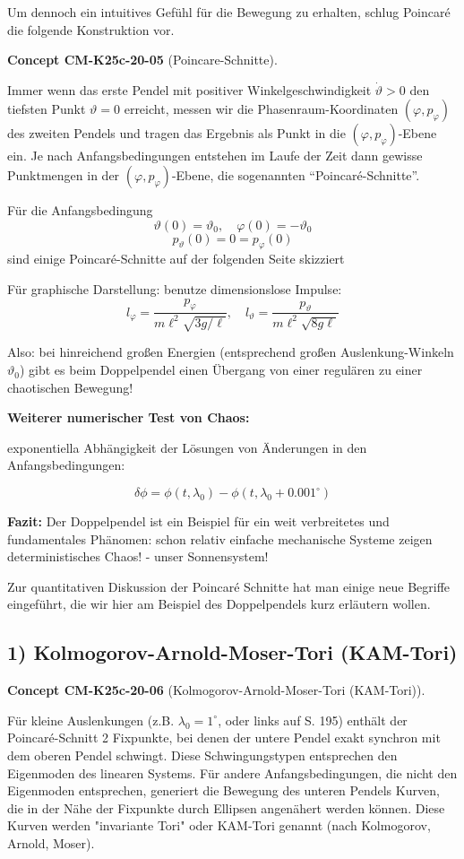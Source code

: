 \documentclass[10pt, letterpaper]{article}
\newcommand{\CustomHeading}[3]{%
  \par\medskip\noindent%
  \textbf{#1 #2} \textnormal{(#3)}.\enskip%
}
\newenvironment{CONC}[2]{\begin{unitbox}\CustomHeading{Concept}{#1}{#2}}{\end{unitbox}}
\begin{document}
Um dennoch ein intuitives Gefühl für die Bewegung zu erhalten, schlug Poincaré die folgende Konstruktion vor.

\begin{CONC}{CM-K25c-20-05}{Poincare-Schnitte}
Immer wenn das erste Pendel mit positiver Winkelgeschwindigkeit $\dot{\vartheta}>0$ den tiefsten Punkt $\vartheta=0$ erreicht, messen wir die Phasenraum-Koordinaten $(\varphi,p_\varphi)$ des zweiten Pendels und tragen das Ergebnis als Punkt in die $(\varphi,p_\varphi)$-Ebene ein. Je nach Anfangsbedingungen entstehen im Laufe der Zeit dann gewisse Punktmengen in der $(\varphi,p_\varphi)$-Ebene, die sogenannten ``Poincaré-Schnitte''.

Für die Anfangsbedingung
\[\vartheta(0)=\vartheta_0, \quad \varphi(0)=-\vartheta_0\]
\[p_\vartheta(0)=0=p_\varphi(0)\]
sind einige Poincaré-Schnitte auf der folgenden Seite skizziert


Für graphische Darstellung: benutze dimensionslose Impulse:
\[l_\varphi = \frac{p_\varphi}{m\ell^2\sqrt{3g/\ell}}, \quad l_\vartheta = \frac{p_\vartheta}{m\ell^2\sqrt{8g\ell}}\]



\noindent Also: bei hinreichend großen Energien (entsprechend großen Auslenkung-Winkeln $\vartheta_0$) gibt es beim Doppelpendel einen Übergang von einer regulären zu einer chaotischen Bewegung!
\end{CONC}


\textbf{Weiterer numerischer Test von Chaos:}

exponentiella Abhängigkeit der Lösungen von Änderungen in den Anfangsbedingungen:



\[ \delta\phi = \phi(t,\lambda_0) - \phi(t,\lambda_0+0.001^\circ) \]

\textbf{Fazit:} Der Doppelpendel ist ein Beispiel für ein weit verbreitetes und fundamentales Phänomen: schon relativ einfache mechanische Systeme zeigen deterministisches Chaos! - unser Sonnensystem!

Zur quantitativen Diskussion der Poincaré Schnitte hat man einige neue Begriffe eingeführt, die wir hier am Beispiel des Doppelpendels kurz erläutern wollen.

\subsection*{1) Kolmogorov-Arnold-Moser-Tori (KAM-Tori)}

\begin{CONC}{CM-K25c-20-06}{Kolmogorov-Arnold-Moser-Tori (KAM-Tori)}
Für kleine Auslenkungen (z.B. $\lambda_0=1^\circ$, oder links auf S. 195) enthält der Poincaré-Schnitt 2 Fixpunkte, bei denen der untere Pendel exakt synchron mit dem oberen Pendel schwingt. Diese Schwingungstypen entsprechen den Eigenmoden des linearen
Systems. Für andere Anfangsbedingungen, die nicht den Eigenmoden entsprechen, generiert die Bewegung des unteren Pendels Kurven, die in der Nähe der Fixpunkte durch Ellipsen angenähert werden können. Diese Kurven werden "invariante Tori" oder KAM-Tori genannt (nach Kolmogorov, Arnold, Moser).
\end{CONC}
\end{document}
